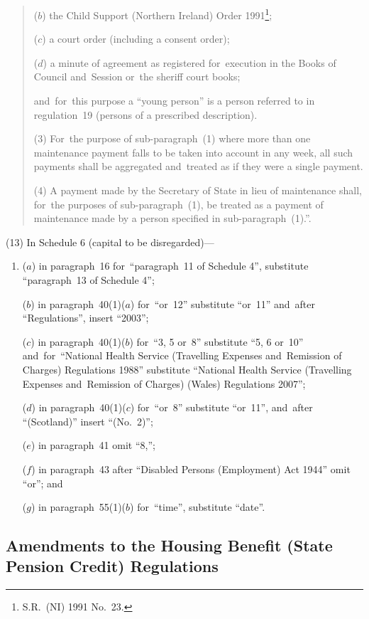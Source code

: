 \documentclass[12pt,a4paper]{article}
\begin{document}
\begin{enumerate}
\begin{quotation}
\begin{enumerate}
($b$) the Child Support (Northern Ireland) Order 1991\footnote{S.R.~(NI) 1991 No.~23.};

($c$) a court order (including a consent order);

($d$) a minute of agreement as registered for~execution in the Books of Council and~Session or~the sheriff court books;
\end{enumerate}
and~for~this purpose a “young person” is a person referred to in regulation~19 (persons of a prescribed description).

(3) For~the purpose of sub-paragraph~(1) where more than one maintenance payment falls to be taken into account in any week, all such payments shall be aggregated and~treated as if they were a single payment.

(4) A payment made by the Secretary of State in lieu of maintenance shall, for~the purposes of sub-paragraph~(1), be treated as a payment of maintenance made by a person specified in sub-paragraph~(1).”.
\end{quotation}
\end{enumerate}

(13) In Schedule 6 (capital to be disregarded)—
\begin{enumerate}\item[]
($a$) in paragraph~16 for~“paragraph~11 of Schedule 4”, substitute “paragraph~13 of Schedule 4”;

($b$) in paragraph~40(1)($a$)  for~“or~12” substitute “or~11” and~after “Regulations”, insert “2003”;

($c$) in paragraph~40(1)($b$)  for~“3, 5 or~8” substitute “5, 6 or~10” and~for~“National Health Service (Travelling Expenses and~Remission of Charges) Regulations 1988” substitute “National Health Service (Travelling Expenses and~Remission of Charges) (Wales) Regulations 2007”;

($d$) in paragraph~40(1)($c$)  for~“or~8” substitute “or~11”, and~after “(Scotland)” insert “(No.~2)”;

($e$) in paragraph~41 omit “8,”;

($f$) in paragraph~43 after “Disabled Persons (Employment) Act 1944” omit “or”; and

($g$) in paragraph~55(1)($b$)  for~“time”, substitute “date”.
\end{enumerate}

\subsection[4. Amendments to the Housing Benefit (State Pension Credit) Regulations]{\sloppy Amendments to the Housing Benefit (State Pension Credit) Regulations}
\end{document}
